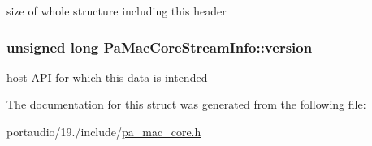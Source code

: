 size of whole structure including this header \hypertarget{struct_pa_mac_core_stream_info_ad5ef9592026b8e98f2bf17a61677b064}{
\subsubsection[{version}]{\setlength{\rightskip}{0pt plus 5cm}unsigned long Pa\+Mac\+Core\+Stream\+Info\+::version}}\label{struct_pa_mac_core_stream_info_ad5ef9592026b8e98f2bf17a61677b064}
host A\+P\+I for which this data is intended 

The documentation for this struct was generated from the following file\+:\begin{DoxyCompactItemize}
\item 
portaudio/19./include/\hyperlink{pa__mac__core_8h}{pa\+\_\+mac\+\_\+core.\+h}\end{DoxyCompactItemize}
